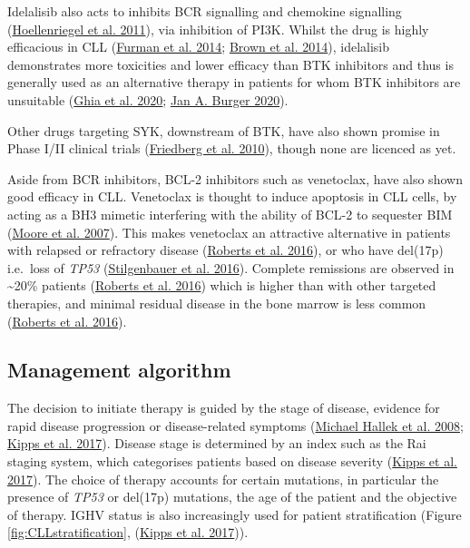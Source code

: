 \documentclass[11pt, a4paper, twosided]{book}
\begin{document}
Idelalisib also acts to inhibits BCR signalling and chemokine signalling (\protect\hyperlink{ref-Hoellenriegel2011}{Hoellenriegel et al. 2011}), via inhibition of PI3K. Whilst the drug is highly efficacious in CLL (\protect\hyperlink{ref-Furman2014}{Furman et al. 2014}; \protect\hyperlink{ref-Brown2014}{Brown et al. 2014}), idelalisib demonstrates more toxicities and lower efficacy than BTK inhibitors and thus is generally used as an alternative therapy in patients for whom BTK inhibitors are unsuitable (\protect\hyperlink{ref-Ghia2020}{Ghia et al. 2020}; \protect\hyperlink{ref-Burger2020}{Jan A. Burger 2020}).

Other drugs targeting SYK, downstream of BTK, have also shown promise in Phase I/II clinical trials (\protect\hyperlink{ref-Friedberg2010}{Friedberg et al. 2010}), though none are licenced as yet.

Aside from BCR inhibitors, BCL-2 inhibitors such as venetoclax, have also shown good efficacy in CLL. Venetoclax is thought to induce apoptosis in CLL cells, by acting as a BH3 mimetic interfering with the ability of BCL-2 to sequester BIM (\protect\hyperlink{ref-Moore2007}{Moore et al. 2007}). This makes venetoclax an attractive alternative in patients with relapsed or refractory disease (\protect\hyperlink{ref-Roberts2016}{Roberts et al. 2016}), or who have del(17p) i.e.~loss of \emph{TP53 }(\protect\hyperlink{ref-Stilgenbauer2016}{Stilgenbauer et al. 2016}). Complete remissions are observed in \textasciitilde20\% patients (\protect\hyperlink{ref-Roberts2016}{Roberts et al. 2016}) which is higher than with other targeted therapies, and minimal residual disease in the bone marrow is less common (\protect\hyperlink{ref-Roberts2016}{Roberts et al. 2016}).

\hypertarget{intro-management-algorithm}{%
\subsection{Management algorithm}\label{intro-management-algorithm}}

The decision to initiate therapy is guided by the stage of disease, evidence for rapid disease progression or disease-related symptoms (\protect\hyperlink{ref-Hallek2008}{Michael Hallek et al. 2008}; \protect\hyperlink{ref-Kipps2017}{Kipps et al. 2017}). Disease stage is determined by an index such as the Rai staging system, which categorises patients based on disease severity (\protect\hyperlink{ref-Kipps2017}{Kipps et al. 2017}). The choice of therapy accounts for certain mutations, in particular the presence of \emph{TP53} or del(17p) mutations, the age of the patient and the objective of therapy. IGHV status is also increasingly used for patient stratification (Figure \ref{fig:CLLstratification}, (\protect\hyperlink{ref-Kipps2017}{Kipps et al. 2017})).
\end{document}
